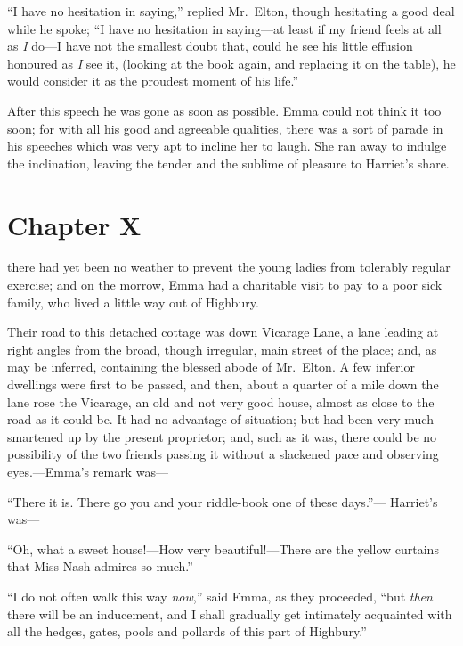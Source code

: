 ``I have no hesitation in saying,'' replied Mr.\ Elton, though hesitating
a good deal while he spoke; ``I have no hesitation in saying---at
least if my friend feels at all as \emph{I} do---I have not the smallest
doubt that, could he see his little effusion honoured as \emph{I} see it,
(looking at the book again, and replacing it on the table), he
would consider it as the proudest moment of his life.''

After this speech he was gone as soon as possible.  Emma could not
think it too soon; for with all his good and agreeable qualities,
there was a sort of parade in his speeches which was very apt
to incline her to laugh.  She ran away to indulge the inclination,
leaving the tender and the sublime of pleasure to Harriet's share.



\chapter{Chapter X}


 there had yet been no weather
to prevent the young ladies from tolerably regular exercise;
and on the morrow, Emma had a charitable visit to pay to a poor
sick family, who lived a little way out of Highbury.

Their road to this detached cottage was down Vicarage Lane, a lane
leading at right angles from the broad, though irregular, main street
of the place; and, as may be inferred, containing the blessed abode
of Mr.\ Elton.  A few inferior dwellings were first to be passed,
and then, about a quarter of a mile down the lane rose the Vicarage,
an old and not very good house, almost as close to the road as it
could be.  It had no advantage of situation; but had been very much
smartened up by the present proprietor; and, such as it was,
there could be no possibility of the two friends passing it without
a slackened pace and observing eyes.---Emma's remark was---%

``There it is.  There go you and your riddle-book one of these days.''---%
Harriet's was---%

``Oh, what a sweet house!---How very beautiful!---There are the yellow
curtains that Miss Nash admires so much.''

``I do not often walk this way \emph{now},'' said Emma, as they proceeded,
``but \emph{then} there will be an inducement, and I shall gradually get
intimately acquainted with all the hedges, gates, pools and pollards
of this part of Highbury.''

